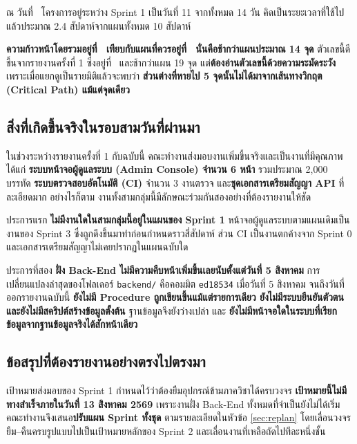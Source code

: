 ณ วันที่ \reportdate\ โครงการอยู่ระหว่าง Sprint 1 เป็นวันที่ 11 จากทั้งหมด 14 วัน คิดเป็นระยะเวลาที่ใช้ไปแล้วประมาณ 2.4 สัปดาห์จากแผนทั้งหมด 10 สัปดาห์

\textbf{ความก้าวหน้าโดยรวมอยู่ที่ \actualpct\ เทียบกับแผนที่ควรอยู่ที่ \plannedpct\ นั่นคือช้ากว่าแผนประมาณ 14 จุด} ตัวเลขนี้ดีขึ้นจากรายงานครั้งที่ 1 ซึ่งอยู่ที่ \prevpct\ และช้ากว่าแผน 19 จุด แต่\textbf{ต้องอ่านตัวเลขนี้ด้วยความระมัดระวัง} เพราะเมื่อแยกดูเป็นรายมิติแล้วจะพบว่า \textbf{ส่วนต่างที่หายไป 5 จุดนั้นไม่ได้มาจากเส้นทางวิกฤต (Critical Path) แม้แต่จุดเดียว}

\subsection*{สิ่งที่เกิดขึ้นจริงในรอบสามวันที่ผ่านมา}

ในช่วงระหว่างรายงานครั้งที่ 1 กับฉบับนี้ คณะทำงานส่งมอบงานเพิ่มขึ้นจริงและเป็นงานที่มีคุณภาพ ได้แก่ \textbf{ระบบหน้าจอผู้ดูแลระบบ (Admin Console) จำนวน 6 หน้า} รวมประมาณ 2{,}000 บรรทัด \textbf{ระบบตรวจสอบอัตโนมัติ (CI)} จำนวน 3 งานตรวจ และ\textbf{ชุดเอกสารเตรียมสัญญา API} ที่ละเอียดมาก อย่างไรก็ตาม งานทั้งสามกลุ่มนี้มีลักษณะร่วมกันสองอย่างที่ต้องรายงานให้ชัด

ประการแรก \textbf{ไม่มีงานใดในสามกลุ่มนี้อยู่ในแผนของ Sprint 1} หน้าจอผู้ดูแลระบบตามแผนเดิมเป็นงานของ Sprint 3 ซึ่งถูกดึงขึ้นมาทำก่อนกำหนดราวสี่สัปดาห์ ส่วน CI เป็นงานตกค้างจาก Sprint 0 และเอกสารเตรียมสัญญาไม่เคยปรากฏในแผนฉบับใด

ประการที่สอง \textbf{ฝั่ง Back-End ไม่มีความคืบหน้าเพิ่มขึ้นเลยนับตั้งแต่วันที่ 5 สิงหาคม} การเปลี่ยนแปลงล่าสุดของโฟลเดอร์ \texttt{backend/} คือคอมมิต \texttt{ed18534} เมื่อวันที่ 5 สิงหาคม จนถึงวันที่ออกรายงานฉบับนี้ \textbf{ยังไม่มี Procedure ถูกเขียนขึ้นแม้แต่รายการเดียว ยังไม่มีระบบยืนยันตัวตน และยังไม่มีสคริปต์สร้างข้อมูลตั้งต้น} ฐานข้อมูลจึงยังว่างเปล่า และ \textbf{ยังไม่มีหน้าจอใดในระบบที่เรียกข้อมูลจากฐานข้อมูลจริงได้สักหน้าเดียว}

\subsection*{ข้อสรุปที่ต้องรายงานอย่างตรงไปตรงมา}

เป้าหมายส่งมอบของ Sprint 1 กำหนดไว้ว่าต้องยืมอุปกรณ์ข้ามภาควิชาได้ครบวงจร \textbf{เป้าหมายนี้ไม่มีทางสำเร็จภายในวันที่ 13 สิงหาคม 2569} เพราะงานฝั่ง Back-End ทั้งหมดที่จำเป็นยังไม่ได้เริ่ม คณะทำงานจึงเสนอ\textbf{ปรับแผน Sprint ทั้งชุด} ตามรายละเอียดในหัวข้อ \ref{sec:replan} โดยเลื่อนวงจรยืม–คืนครบรูปแบบไปเป็นเป้าหมายหลักของ Sprint 2 และเลื่อนงานที่เหลือถัดไปทีละหนึ่งชั้น


